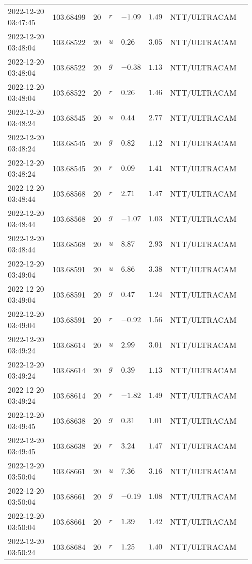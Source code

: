 \documentclass{nature_plusfigure}
\begin{document}
\begin{supplement}
\begin{center}
\begin{longtable}{llllllll}
2022-12-20 03:47:45 & 103.68499 & 20 & $r$ & $-1.09$ & $1.49$ & NTT/ULTRACAM &  \\ 
2022-12-20 03:48:04 & 103.68522 & 20 & $u$ & $0.26$ & $3.05$ & NTT/ULTRACAM &  \\ 
2022-12-20 03:48:04 & 103.68522 & 20 & $g$ & $-0.38$ & $1.13$ & NTT/ULTRACAM &  \\ 
2022-12-20 03:48:04 & 103.68522 & 20 & $r$ & $0.26$ & $1.46$ & NTT/ULTRACAM &  \\ 
2022-12-20 03:48:24 & 103.68545 & 20 & $u$ & $0.44$ & $2.77$ & NTT/ULTRACAM &  \\ 
2022-12-20 03:48:24 & 103.68545 & 20 & $g$ & $0.82$ & $1.12$ & NTT/ULTRACAM &  \\ 
2022-12-20 03:48:24 & 103.68545 & 20 & $r$ & $0.09$ & $1.41$ & NTT/ULTRACAM &  \\ 
2022-12-20 03:48:44 & 103.68568 & 20 & $r$ & $2.71$ & $1.47$ & NTT/ULTRACAM &  \\ 
2022-12-20 03:48:44 & 103.68568 & 20 & $g$ & $-1.07$ & $1.03$ & NTT/ULTRACAM &  \\ 
2022-12-20 03:48:44 & 103.68568 & 20 & $u$ & $8.87$ & $2.93$ & NTT/ULTRACAM &  \\ 
2022-12-20 03:49:04 & 103.68591 & 20 & $u$ & $6.86$ & $3.38$ & NTT/ULTRACAM &  \\ 
2022-12-20 03:49:04 & 103.68591 & 20 & $g$ & $0.47$ & $1.24$ & NTT/ULTRACAM &  \\ 
2022-12-20 03:49:04 & 103.68591 & 20 & $r$ & $-0.92$ & $1.56$ & NTT/ULTRACAM &  \\ 
2022-12-20 03:49:24 & 103.68614 & 20 & $u$ & $2.99$ & $3.01$ & NTT/ULTRACAM &  \\ 
2022-12-20 03:49:24 & 103.68614 & 20 & $g$ & $0.39$ & $1.13$ & NTT/ULTRACAM &  \\ 
2022-12-20 03:49:24 & 103.68614 & 20 & $r$ & $-1.82$ & $1.49$ & NTT/ULTRACAM &  \\ 
2022-12-20 03:49:45 & 103.68638 & 20 & $g$ & $0.31$ & $1.01$ & NTT/ULTRACAM &  \\ 
2022-12-20 03:49:45 & 103.68638 & 20 & $r$ & $3.24$ & $1.47$ & NTT/ULTRACAM &  \\ 
2022-12-20 03:50:04 & 103.68661 & 20 & $u$ & $7.36$ & $3.16$ & NTT/ULTRACAM &  \\ 
2022-12-20 03:50:04 & 103.68661 & 20 & $g$ & $-0.19$ & $1.08$ & NTT/ULTRACAM &  \\ 
2022-12-20 03:50:04 & 103.68661 & 20 & $r$ & $1.39$ & $1.42$ & NTT/ULTRACAM &  \\ 
2022-12-20 03:50:24 & 103.68684 & 20 & $r$ & $1.25$ & $1.40$ & NTT/ULTRACAM &  \\ 

\end{longtable}
\end{center}
\end{supplement}
\end{document}
